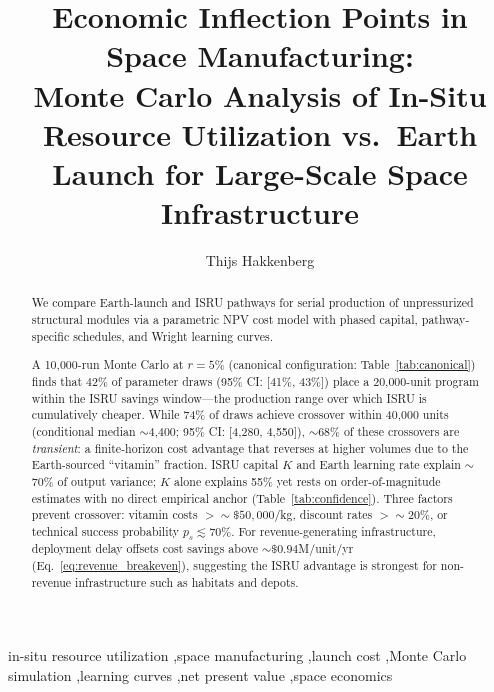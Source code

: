 \documentclass[preprint,12pt]{elsarticle}
\begin{document}
\begin{frontmatter}

\title{Economic Inflection Points in Space Manufacturing:\\ Monte Carlo Analysis of In-Situ Resource Utilization vs.\ Earth Launch for Large-Scale Space Infrastructure}

\author[dyson]{Thijs Hakkenberg}

\address[dyson]{Project Dyson, Open Research Initiative}

\begin{abstract}
We compare Earth-launch and ISRU pathways for serial production of unpressurized structural modules via a parametric NPV cost model with phased capital, pathway-specific schedules, and Wright learning curves.

A 10{,}000-run Monte Carlo at $r = 5\%$ (canonical configuration: Table~\ref{tab:canonical}) finds that 42\% of parameter draws (95\% CI: [41\%, 43\%]) place a 20{,}000-unit program within the ISRU savings window---the production range over which ISRU is cumulatively cheaper. While 74\% of draws achieve crossover within 40{,}000 units (conditional median ${\sim}$4{,}400; 95\% CI: [4{,}280, 4{,}550]), ${\sim}$68\% of these crossovers are \emph{transient}: a finite-horizon cost advantage that reverses at higher volumes due to the Earth-sourced ``vitamin'' fraction. ISRU capital $K$ and Earth learning rate explain ${\sim}$70\% of output variance; $K$ alone explains 55\% yet rests on order-of-magnitude estimates with no direct empirical anchor (Table~\ref{tab:confidence}). Three factors prevent crossover: vitamin costs $> {\sim}\$50{,}000$/kg, discount rates $> {\sim}20\%$, or technical success probability $p_s \lesssim 70\%$. For revenue-generating infrastructure, deployment delay offsets cost savings above ${\sim}\$0.94$M/unit/yr (Eq.~\ref{eq:revenue_breakeven}), suggesting the ISRU advantage is strongest for non-revenue infrastructure such as habitats and depots.
\end{abstract}

\begin{keyword}
in-situ resource utilization \sep space manufacturing \sep launch cost \sep Monte Carlo simulation \sep learning curves \sep net present value \sep space economics
\end{keyword}

\end{frontmatter}
\end{document}
